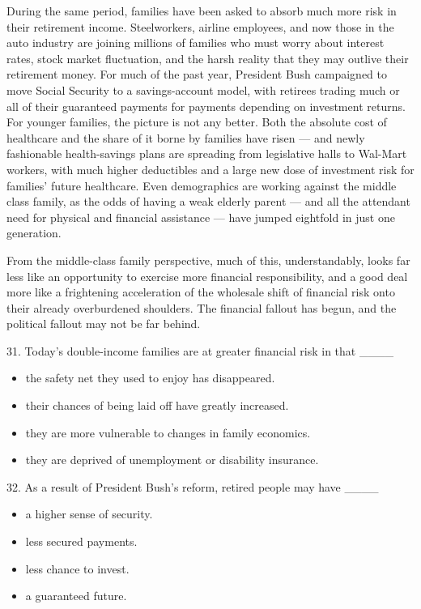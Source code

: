 \documentclass[UTF8,11pt]{ctexart}
\begin{document}
During the same period, families have been asked to absorb much more risk in their retirement income. Steelworkers, airline employees, and now those in the auto industry are joining millions of families who must worry about interest rates, stock market fluctuation, and the harsh reality that they may outlive their retirement money. For much of the past year, President Bush campaigned to move Social Security to a savings-account model, with retirees trading much or all of their guaranteed payments for payments depending on investment returns. For younger families, the picture is not any better. Both the absolute cost of healthcare and the share of it borne by families have risen — and newly fashionable health-savings plans are spreading from legislative halls to Wal-Mart workers, with much higher deductibles and a large new dose of investment risk for families’ future healthcare. Even demographics are working against the middle class family, as the odds of having a weak elderly parent — and all the attendant need for physical and financial assistance — have jumped eightfold in just one generation.


From the middle-class family perspective, much of this, understandably, looks far less like an opportunity to exercise more financial responsibility, and a good deal more like a frightening acceleration of the wholesale shift of financial risk onto their already overburdened shoulders. The financial fallout has begun, and the political fallout may not be far behind.


31. Today’s double-income families are at greater financial risk in that \_\_\_\_


\begin{itemize}[leftmargin=2em,itemsep=.2em,topsep=.4em]\item[A.] the safety net they used to enjoy has disappeared.
\item[B.] their chances of being laid off have greatly increased.
\item[C.] they are more vulnerable to changes in family economics.
\item[D.] they are deprived of unemployment or disability insurance.
\end{itemize}

32. As a result of President Bush’s reform, retired people may have \_\_\_\_


\begin{itemize}[leftmargin=2em,itemsep=.2em,topsep=.4em]\item[A.] a higher sense of security.
\item[B.] less secured payments.
\item[C.] less chance to invest.
\item[D.] a guaranteed future.
\end{itemize}
\end{document}
